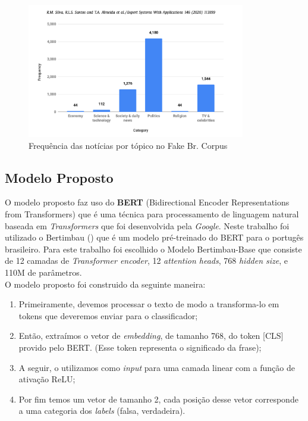 \begin{figure}[h]
    \centering
    \includegraphics[width=0.85\textwidth]{Imagens/categorias_dataset.png}
    \caption{Frequência das notícias por tópico no Fake Br. Corpus}
    \label{fig:news_topic_dataset}
\end{figure}



\subsection{Modelo Proposto}

O modelo proposto faz uso do \textbf{BERT} (Bidirectional Encoder Representations from Transformers) que é uma técnica para processamento de linguagem natural baseada em \textit{Transformers} que foi desenvolvida pela \textit{Google}. Neste trabalho foi utilizado o Bertimbau (\cite{souza2020bertimbau}) que é um modelo pré-treinado do BERT para o portugês brasileiro. Para este trabalho foi escolhido o Modelo Bertimbau-Base que consiste de 12 camadas de \textit{Transformer encoder}, 12 \textit{attention heads}, 768 \textit{hidden size}, e 110M de parâmetros.\\

O modelo proposto foi construido da seguinte maneira: \\
\begin{enumerate}
    \item Primeiramente, devemos processar o texto de modo a transforma-lo em tokens que deveremos enviar para o classificador;
    \item  Então, extraímos o vetor de \textit{embedding}, de tamanho 768, do token [CLS] provido pelo BERT. (Esse token representa o significado da frase);
    \item A seguir, o utilizamos como \textit{input} para uma camada linear com a função de ativação ReLU;
    \item Por fim temos um vetor de tamanho 2, cada posição desse vetor corresponde a uma categoria dos \textit{labels} (falsa, verdadeira).\\
\end{enumerate}


